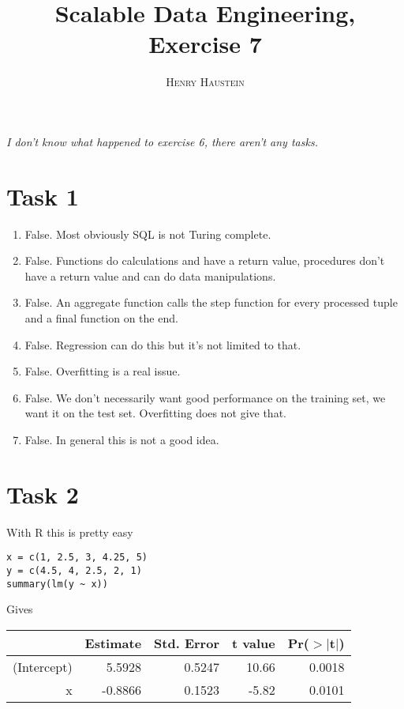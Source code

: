 \documentclass{article}
\title{\textbf{Scalable Data Engineering, Exercise 7}}
\author{\textsc{Henry Haustein}}
\date{}
\begin{document}
	\maketitle
	
	\textit{I don't know what happened to exercise 6, there aren't any tasks.}
	
	\section*{Task 1}
	\begin{enumerate}[label=(\alph*)]
		\item False. Most obviously SQL is not Turing complete.
		\item False. Functions do calculations and have a return value, procedures don't have a return value and can do data manipulations.
		\item False. An aggregate function calls the step function for every processed tuple and a final function on the end.
		\item False. Regression can do this but it's not limited to that.
		\item False. Overfitting is a real issue.
		\item False. We don't necessarily want good performance on the training set, we want it on the test set. Overfitting does not give that.
		\item False. In general this is not a good idea.
	\end{enumerate}

	\section*{Task 2}
	With R this is pretty easy
	\begin{lstlisting}[style=R]
x = c(1, 2.5, 3, 4.25, 5)
y = c(4.5, 4, 2.5, 2, 1)
summary(lm(y ~ x))
	\end{lstlisting}
	Gives
	\begin{table}[ht]
	\centering
	\begin{tabular}{rrrrr}
	  \hline
	 & Estimate & Std. Error & t value & Pr($>$$|$t$|$) \\ 
	  \hline
	(Intercept) & 5.5928 & 0.5247 & 10.66 & 0.0018 \\ 
	  x & -0.8866 & 0.1523 & -5.82 & 0.0101 \\ 
	   \hline
	\end{tabular}
\end{table}
\end{document}
